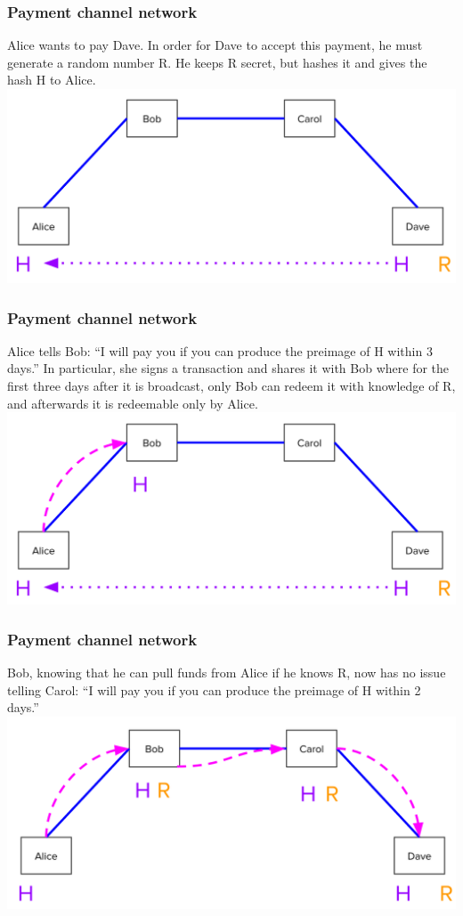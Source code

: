 \documentclass{beamer}
\begin{document}
\begin{frame}
\frametitle{Payment channel network}
Alice wants to pay Dave. In order for Dave to accept this payment, he must generate a random number R. He keeps R secret, but hashes it and gives the hash H to Alice.
\includegraphics[scale=0.12]{images/network1.png}

\end{frame}
\begin{frame}
\frametitle{Payment channel network}
Alice tells Bob: “I will pay you if you can produce the preimage of H within 3 days.” In particular, she signs a transaction and shares it with Bob where for the first three days after it is broadcast, only Bob can redeem it with knowledge of R, and afterwards it is redeemable only by Alice.
\includegraphics[scale=0.12]{images/network2.png}

\end{frame}
\begin{frame}
\frametitle{Payment channel network}
Bob, knowing that he can pull funds from Alice if he knows R, now has no issue telling Carol: “I will pay you if you can produce the preimage of H within 2 days.”
\includegraphics[scale=0.12]{images/network3.png}

\end{frame}
\end{document}
